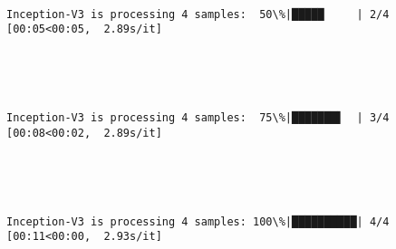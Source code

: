 \documentclass[11pt]{article}
\begin{document}
    \begin{center}
    \end{center}
    { \hspace*{\fill} \\}
    
    \begin{Verbatim}[commandchars=\\\{\}]
Inception-V3 is processing 4 samples:  50\%|█████     | 2/4 [00:05<00:05,  2.89s/it]
    \end{Verbatim}

    \begin{center}
    \end{center}
    { \hspace*{\fill} \\}
    
    \begin{center}
    \end{center}
    { \hspace*{\fill} \\}
    
    \begin{Verbatim}[commandchars=\\\{\}]
Inception-V3 is processing 4 samples:  75\%|███████▌  | 3/4 [00:08<00:02,  2.89s/it]
    \end{Verbatim}

    \begin{center}
    \end{center}
    { \hspace*{\fill} \\}
    
    \begin{center}
    \end{center}
    { \hspace*{\fill} \\}
    
    \begin{Verbatim}[commandchars=\\\{\}]
Inception-V3 is processing 4 samples: 100\%|██████████| 4/4 [00:11<00:00,  2.93s/it]
    \end{Verbatim}
\end{document}
